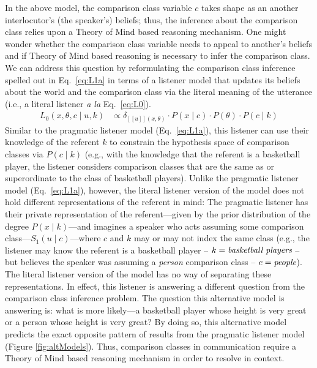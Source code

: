 \documentclass[doc, floatsintext]{apa6}
\begin{document}
In the above model, the comparison class variable $c$ takes shape as an another interlocutor's (the speaker's) beliefs; thus, the inference about the comparison class relies upon a Theory of Mind based reasoning mechanism. 
One might wonder whether the comparison class variable needs to appeal to another's beliefs and if Theory of Mind based reasoning is necessary to infer the comparison class. 
We can address this question by reformulating the comparison class inference spelled out in Eq.~\ref{eq:L1a} in terms of a listener model that updates its beliefs about the world and the comparison class via the literal meaning of the utterance (i.e., a literal listener \emph{a la} Eq.~\ref{eq:L0}). 
%
%
  \begin{align}
L_{0}(x, \theta, c \mid u, k) &\propto \delta_{[\![u]\!](x, \theta)} \cdot P(x \mid c)\cdot P(\theta) \cdot P(c \mid k)  \label{eq:L0alt}
\end{align}
%
Similar to the pragmatic listener model (Eq.~\ref{eq:L1a}), this listener can use their knowledge of the referent $k$ to constrain the hypothesis space of comparison classes via $P(c \mid k)$ (e.g., with the knowledge that the referent is a basketball player, the listener considers comparison classes that are the same as or superordinate to the class of basketball players).
Unlike the pragmatic listener model (Eq.~\ref{eq:L1a}), however, the literal listener version of the model does not hold different representations of the referent in mind: The pragmatic listener has their private representation of the referent---given by the prior distribution of the degree $P(x \mid k)$---and imagines a speaker who acts assuming some comparison class---$S_1(u \mid c)$---where $c$ and $k$ may or may not index the same class (e.g., the listener may know the referent is a basketball player -- $k = \emph{basketball players}$ -- but believes the speaker was assuming a \emph{person} comparison class -- $c = \emph{people}$).
The literal listener version of the model has no way of separating these representations.
In effect, this listener is answering a different question from the comparison class inference problem. The question this alternative model is answering is: what is more likely---a basketball player whose height is very great or a person whose height is very great? 
By doing so, this alternative model predicts the exact opposite pattern of results from the pragmatic listener model (Figure \ref{fig:altModels}). 
Thus, comparison classes in communication require a Theory of Mind based reasoning mechanism in order to resolve in context. 
\end{document}
